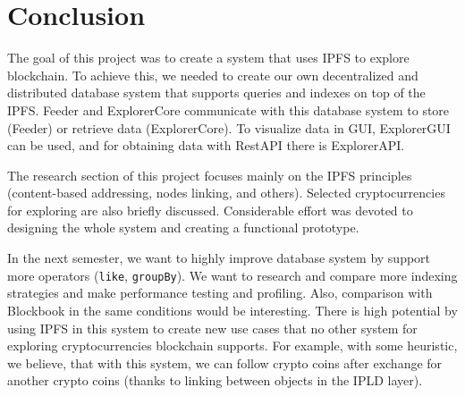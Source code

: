 \chapter{Conclusion}
\label{Conclusion}
The goal of this project was to create a system that uses IPFS to explore blockchain. To achieve this, we needed to create our own decentralized and distributed database system that supports queries and indexes on top of the IPFS. Feeder and ExplorerCore communicate with this database system to store (Feeder) or retrieve data (ExplorerCore). To visualize data in GUI, ExplorerGUI can be used, and for obtaining data with RestAPI there is ExplorerAPI.

The research section of this project focuses mainly on the IPFS principles (content-based addressing, nodes linking, and others). Selected cryptocurrencies for exploring are also briefly discussed. Considerable effort was devoted to designing the whole system and creating a functional prototype.

In the next semester, we want to highly improve database system by support more operators (\texttt{like}, \texttt{groupBy}). We want to research and compare more indexing strategies and make performance testing and profiling. Also, comparison with Blockbook in the same conditions would be interesting. There is high potential by using IPFS in this system to create new use cases that no other system for exploring cryptocurrencies blockchain supports. For example, with some heuristic, we believe, that with this system, we can follow crypto coins after exchange for another crypto coins (thanks to linking between objects in the IPLD layer).

